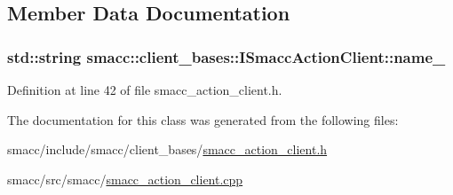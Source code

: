 \subsection{Member Data Documentation}
\subsubsection[{\texorpdfstring{name\+\_\+}{name_}}]{\setlength{\rightskip}{0pt plus 5cm}std\+::string smacc\+::client\+\_\+bases\+::\+I\+Smacc\+Action\+Client\+::name\+\_\+\hspace{0.3cm}{\ttfamily [protected]}}\hypertarget{classsmacc_1_1client__bases_1_1ISmaccActionClient_a74c660a4c111a3b8858b9b7b1cedc866}{}\label{classsmacc_1_1client__bases_1_1ISmaccActionClient_a74c660a4c111a3b8858b9b7b1cedc866}


Definition at line 42 of file smacc\+\_\+action\+\_\+client.\+h.



The documentation for this class was generated from the following files\+:\begin{DoxyCompactItemize}
\item 
smacc/include/smacc/client\+\_\+bases/\hyperlink{smacc__action__client_8h}{smacc\+\_\+action\+\_\+client.\+h}\item 
smacc/src/smacc/\hyperlink{smacc__action__client_8cpp}{smacc\+\_\+action\+\_\+client.\+cpp}\end{DoxyCompactItemize}
